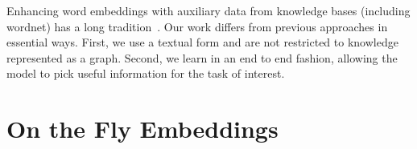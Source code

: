 Enhancing word embeddings with auxiliary data from knowledge bases (including wordnet) has a long tradition~\citep{Xu:2014:RGF:2661829.2662038, faruqui2014retrofitting}. Our work differs from previous approaches in essential ways. First, we use a textual form and are not restricted to knowledge represented as a graph. Second, we learn in an end to end fashion, allowing the model to pick useful information for the task of interest.


\section{On the Fly Embeddings}
\label{sec:methods}

